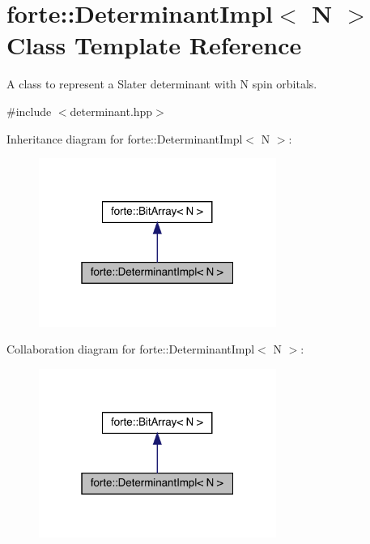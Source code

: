 \hypertarget{classforte_1_1_determinant_impl}{}\section{forte\+:\+:Determinant\+Impl$<$ N $>$ Class Template Reference}
\label{classforte_1_1_determinant_impl}


A class to represent a Slater determinant with N spin orbitals.  




{\ttfamily \#include $<$determinant.\+hpp$>$}



Inheritance diagram for forte\+:\+:Determinant\+Impl$<$ N $>$\+:
\nopagebreak
\begin{figure}[H]
\begin{center}
\leavevmode
\includegraphics[width=220pt]{classforte_1_1_determinant_impl__inherit__graph}
\end{center}
\end{figure}


Collaboration diagram for forte\+:\+:Determinant\+Impl$<$ N $>$\+:
\nopagebreak
\begin{figure}[H]
\begin{center}
\leavevmode
\includegraphics[width=220pt]{classforte_1_1_determinant_impl__coll__graph}
\end{center}
\end{figure}
